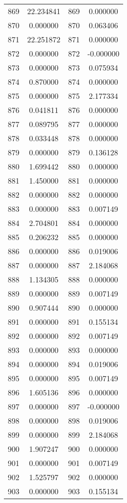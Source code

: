 \documentclass[12pt]{article}
\begin{document}
\begin{longtable}{@{}cccc@{}}
869 & 22.234841 & 869 & 0.000000 \\
870 & 0.000000 & 870 & 0.063406 \\
871 & 22.251872 & 871 & 0.000000 \\
872 & 0.000000 & 872 & -0.000000 \\
873 & 0.000000 & 873 & 0.075934 \\
874 & 0.870000 & 874 & 0.000000 \\
875 & 0.000000 & 875 & 2.177334 \\
876 & 0.041811 & 876 & 0.000000 \\
877 & 0.089795 & 877 & 0.000000 \\
878 & 0.033448 & 878 & 0.000000 \\
879 & 0.000000 & 879 & 0.136128 \\
880 & 1.699442 & 880 & 0.000000 \\
881 & 1.450000 & 881 & 0.000000 \\
882 & 0.000000 & 882 & 0.000000 \\
883 & 0.000000 & 883 & 0.007149 \\
884 & 2.704801 & 884 & 0.000000 \\
885 & 0.206232 & 885 & 0.000000 \\
886 & 0.000000 & 886 & 0.019006 \\
887 & 0.000000 & 887 & 2.184068 \\
888 & 1.134305 & 888 & 0.000000 \\
889 & 0.000000 & 889 & 0.007149 \\
890 & 0.907444 & 890 & 0.000000 \\
891 & 0.000000 & 891 & 0.155134 \\
892 & 0.000000 & 892 & 0.007149 \\
893 & 0.000000 & 893 & 0.000000 \\
894 & 0.000000 & 894 & 0.019006 \\
895 & 0.000000 & 895 & 0.007149 \\
896 & 1.605136 & 896 & 0.000000 \\
897 & 0.000000 & 897 & -0.000000 \\
898 & 0.000000 & 898 & 0.019006 \\
899 & 0.000000 & 899 & 2.184068 \\
900 & 1.907247 & 900 & 0.000000 \\
901 & 0.000000 & 901 & 0.007149 \\
902 & 1.525797 & 902 & 0.000000 \\
903 & 0.000000 & 903 & 0.155134 \\

\end{longtable}
\end{document}
